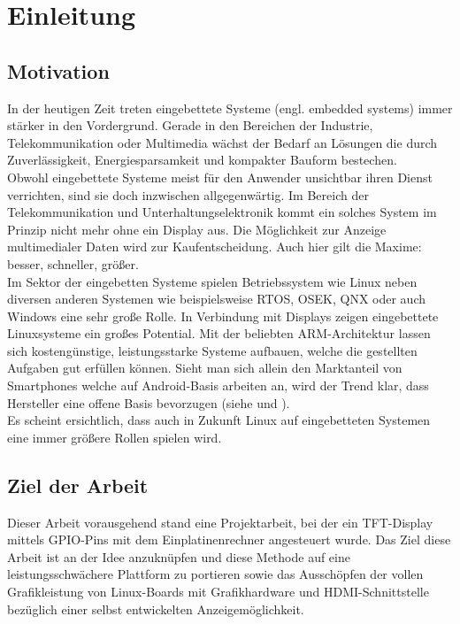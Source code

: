 
\chapter{Einleitung}
\label{cha:Einleitung}

\section{Motivation}
In der heutigen Zeit treten eingebettete Systeme (engl. embedded systems) immer stärker in den Vordergrund. Gerade in den Bereichen der Industrie, Telekommunikation oder Multimedia wächst der Bedarf an Lösungen die durch Zuverlässigkeit, Energiesparsamkeit und kompakter Bauform bestechen.\\
Obwohl eingebettete Systeme meist für den Anwender unsichtbar ihren Dienst verrichten, sind sie doch inzwischen allgegenwärtig. Im Bereich der Telekommunikation und Unterhaltungselektronik kommt ein solches System im Prinzip nicht mehr ohne ein Display aus. Die Möglichkeit zur Anzeige multimedialer Daten wird zur Kaufentscheidung. Auch hier gilt die Maxime: besser, schneller, größer.\\
Im Sektor der eingebetten Systeme spielen Betriebssystem wie Linux neben diversen anderen Systemen wie beispielsweise RTOS, OSEK, QNX oder auch Windows eine sehr große Rolle. In Verbindung mit Displays zeigen eingebettete Linuxsysteme ein großes Potential. Mit der beliebten ARM-Architektur lassen sich kostengünstige, leistungsstarke Systeme aufbauen, welche die gestellten Aufgaben gut erfüllen können. Sieht man sich allein den Marktanteil von Smartphones welche auf Android-Basis arbeiten an, wird der Trend klar, dass Hersteller eine offene Basis bevorzugen (siehe \cite{android2014} und \cite{Brandt2013}).\\
Es scheint ersichtlich, dass auch in Zukunft Linux auf eingebetteten Systemen eine immer größere Rollen spielen wird. 

\section{Ziel der Arbeit}
Dieser Arbeit vorausgehend stand eine Projektarbeit, bei der ein TFT-Display mittels GPIO-Pins mit dem Einplatinenrechner  angesteuert wurde. Das Ziel diese Arbeit ist an der Idee anzuknüpfen und diese Methode auf eine leistungsschwächere Plattform zu portieren sowie das Ausschöpfen der vollen Grafikleistung von Linux-Boards mit Grafikhardware und HDMI-Schnittstelle bezüglich einer selbst entwickelten Anzeigemöglichkeit.
